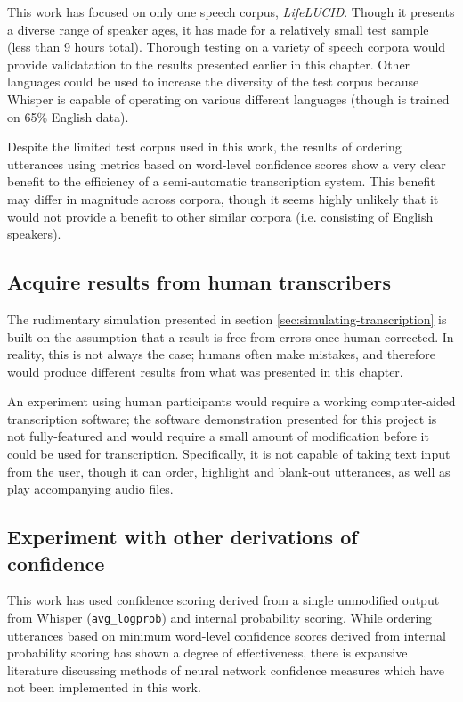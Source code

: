 This work has focused on only one speech corpus, \emph{LifeLUCID}\cite{lifelucid}.
Though it presents a diverse range of speaker ages, it has made for a relatively small test sample (less than 9 hours total).
Thorough testing on a variety of speech corpora would provide validatation to the results presented earlier in this chapter.
Other languages could be used to increase the diversity of the test corpus because Whisper is capable of operating on various different languages (though is trained on 65\% English data\cite{whisper}).

Despite the limited test corpus used in this work, the results of ordering utterances using metrics based on word-level confidence scores show a very clear benefit to the efficiency of a semi-automatic transcription system.
This benefit may differ in magnitude across corpora, though it seems highly unlikely that it would not provide a benefit to other similar corpora (i.e. consisting of English speakers).

\subsection{Acquire results from human transcribers}

The rudimentary simulation presented in section \ref{sec:simulating-transcription} is built on the assumption that a result is free from errors once human-corrected.
In reality, this is not always the case; humans often make mistakes, and therefore would produce different results from what was presented in this chapter.

An experiment using human participants would require a working computer-aided transcription software; the software demonstration presented for this project is not fully-featured and would require a small amount of modification before it could be used for transcription.
Specifically, it is not capable of taking text input from the user, though it can order, highlight and blank-out utterances, as well as play accompanying audio files.

\subsection{Experiment with other derivations of confidence}

This work has used confidence scoring derived from a single unmodified output from Whisper (\texttt{avg\_logprob}) and internal probability scoring.
While ordering utterances based on minimum word-level confidence scores derived from internal probability scoring has shown a degree of effectiveness, there is expansive literature discussing methods of neural network confidence measures which have not been implemented in this work.

